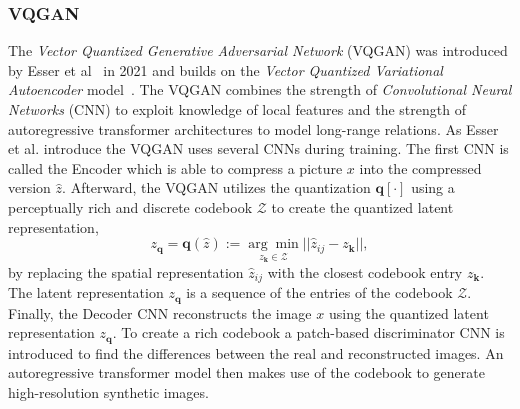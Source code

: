 \subsubsection{VQGAN}
\label{sec:wuerstchen:VQGAN}
The \emph{Vector Quantized Generative Adversarial Network} (VQGAN) was introduced by
Esser et al~\cite{esser2021tamingtransformershighresolutionimage} in 2021 and
builds on the \emph{Vector Quantized Variational Autoencoder}
model~\cite{vdOord2017NeuralDiscreteRepresentationLearning}. The VQGAN combines
the strength of \emph{Convolutional Neural Networks} (CNN) to exploit knowledge
of local features and the strength of autoregressive transformer architectures
to model long-range relations. As Esser et al. introduce the VQGAN uses several
CNNs during training. The first CNN is called the Encoder which is able to
compress a picture $x$ into the compressed version $\hat{z}$. Afterward,
the VQGAN utilizes the quantization $\boldsymbol{q}[\cdot]$ using a
perceptually rich and discrete codebook $\mathcal{Z}$ to create the quantized
latent representation,
\begin{equation}
    z_{\boldsymbol{q}} = \boldsymbol{q}(\hat{z}) :=\underset{z_{\boldsymbol{k}}\in\mathcal{Z}}{\arg\min}||\hat{z}_{ij} - z_{\boldsymbol{k}}||,
\end{equation}
by replacing the spatial representation $\hat{z}_{ij}$ with the closest
codebook entry $z_{\boldsymbol{k}}$. The latent representation
$z_{\boldsymbol{q}}$ is a sequence of the entries of the codebook $\mathcal{Z}$.
Finally, the Decoder CNN reconstructs the image $x$ using the quantized latent
representation $z_{\boldsymbol{q}}$. To create a rich codebook a patch-based
discriminator CNN is introduced to find the differences between the real and
reconstructed images. An autoregressive transformer model then makes use of the
codebook to generate high-resolution synthetic images.

